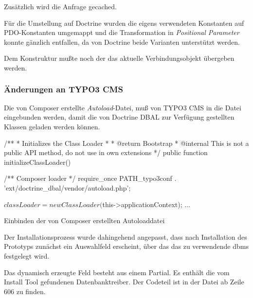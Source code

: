 Zusätzlich wird die Anfrage gecached.

Für die Umstellung auf Doctrine wurden die eigens verwendeten Konstanten auf PDO-Konstanten umgemappt und die Transformation in \textit{Positional Parameter} konnte gänzlich entfallen, da von Doctrine beide Varianten unterstützt werden.


Dem Konstruktur mußte noch der das aktuelle Verbindungsobjekt übergeben werden.

\subsubsection{Änderungen an TYPO3 CMS}
Die von Composer erstellte \textit{Autoload}-Datei, muß von TYPO3 CMS in die Datei  eingebunden werden, damit die von Doctrine DBAL zur Verfügung gestellten Klassen geladen werden können.

\begin{listing}
\begin{phpcode}
	/**
	 * Initializes the Class Loader
	 *
	 * @return Bootstrap
	 * @internal This is not a public API method, do not use in own extensions
	 */
	public function initializeClassLoader() {
		/** Composer loader */
		require_once PATH_typo3conf . 'ext/doctrine_dbal/vendor/autoload.php';

		$classLoader = new ClassLoader($this->applicationContext);
		...
	}
\end{phpcode}
\caption{Einbinden der von Composer erstellten Autoloaddatei}
\label{lst:composerAutoload}
\end{listing}

Der Installationsprozess wurde dahingehend angepasst, dass nach Installation des Prototyps zunächst ein Auswahlfeld erscheint, über das das zu verwendende \gls{dbms} festgelegt wird.

Das dynamisch erzeugte Feld besteht aus einem Partial. Es enthält die vom Install Tool gefundenen Datenbanktreiber. Der Codeteil ist in der Datei  ab Zeile 606 zu finden.


